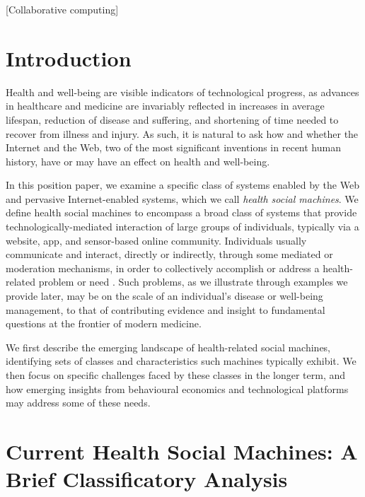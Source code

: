 \documentclass{www13-companion-accepted}
\begin{document}
[Collaborative computing]



\section{Introduction}

Health and well-being are visible indicators of technological
progress, as advances in healthcare and medicine are invariably
reflected in increases in average lifespan, reduction of disease and
suffering, and shortening of time needed to recover from illness and
injury.  As such, it is natural to ask how and whether the Internet
and the Web, two of the most significant inventions in recent human
history, have or may have an effect on health and well-being.

In this position paper, we examine a specific class of systems enabled
by the Web and pervasive Internet-enabled systems, which we call
\emph{health social machines}.  We define health social machines to
encompass a broad class of systems that provide
technologically-mediated interaction of large groups of individuals,
typically via a website, app, and sensor-based online community.
Individuals usually communicate and interact, directly or indirectly,
through some mediated or moderation mechanisms, in order to
collectively accomplish or address a health-related problem or need
\cite{hendler2010semantic}.  Such problems, as we illustrate through
examples we provide later, may be on the scale of an individual's
disease or well-being management, to that of contributing evidence and
insight to fundamental questions at the frontier of modern medicine.

We first describe the emerging landscape of health-related social
machines, identifying sets of classes and characteristics such
machines typically exhibit.  We then focus on specific challenges
faced by these classes in the longer term, and how emerging insights
from behavioural economics and technological platforms may address
some of these needs.

\section{Current Health Social Machines: A Brief Classificatory Analysis}
\end{document}

